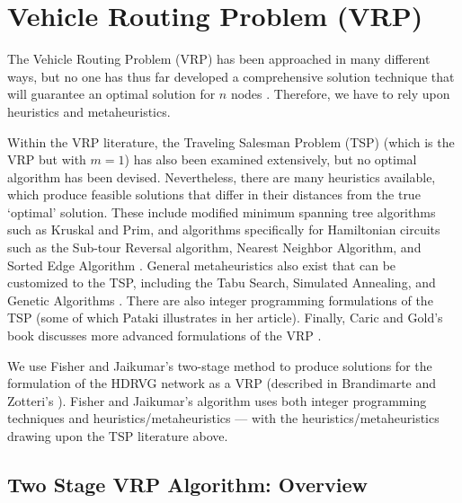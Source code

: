 \documentclass[11pt]{article}
\begin{document}
\section{Vehicle Routing Problem (VRP)}
The Vehicle Routing Problem (VRP) has been approached in many different ways, but no one has thus far developed a comprehensive solution technique that will guarantee an optimal solution for $n$ nodes \cite{VRP_textbook}.  
Therefore, we have to rely upon heuristics and metaheuristics.  %

Within the VRP literature, the Traveling Salesman Problem (TSP) (which is the VRP but with $m=1$) has also been examined extensively, but no optimal algorithm has been devised.  Nevertheless, there are many heuristics available, which produce feasible solutions that differ in their distances from the true `optimal' solution.  These include modified minimum spanning tree algorithms such as Kruskal and Prim, and algorithms specifically for Hamiltonian circuits such as the Sub-tour Reversal algorithm, Nearest Neighbor Algorithm, and Sorted Edge Algorithm \cite{LPOR_textbook,MST,HamCycle,TSP_simple}.  General metaheuristics also exist that can be customized to the TSP, including the Tabu Search, Simulated Annealing, and Genetic Algorithms \cite{LPOR_textbook}.  There are also integer programming formulations of the TSP (some of which Pataki \cite{pataki2003teaching} illustrates in her article). Finally, Caric and Gold's book discusses more advanced formulations of the VRP \cite{VRP_textbook}.  

We use Fisher and Jaikumar's two-stage method to produce solutions for the formulation of the HDRVG network as a VRP (described in Brandimarte and Zotteri's \cite{intro_logistics_book}).  Fisher and Jaikumar's algorithm uses both integer programming techniques and heuristics/metaheuristics --- with the heuristics/metaheuristics drawing upon the TSP literature above. 


\subsection{Two Stage VRP Algorithm: Overview}
\end{document}
